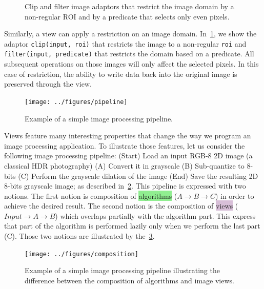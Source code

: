 \begin{figure}[htbp]
  \centering
  \hfil

  \caption{Clip and filter image adaptors that restrict the image domain by a non-regular ROI and by a predicate that
    selects only even pixels.}
  \label{fig:view.clip}
\end{figure}

Similarly, a view can apply a restriction on an image domain. In~\cref{fig:view.clip}, we show the adaptor
\texttt{clip(input, roi)} that restricts the image to a non-regular \texttt{roi} and \texttt{filter(input, predicate)}
that restricts the domain based on a predicate. All subsequent operations on those images will only affect the selected
pixels. In this case of restriction, the ability to write data back into the original image is preserved through the
view.

\begin{figure}[htbp]
  \centering
  \texttt{[image: ../figures/pipeline]}
  \caption{Example of a simple image processing pipeline.}
  \label{fig:view.pipeline}
\end{figure}

Views feature many interesting properties that change the way we program an image processing application. To illustrate
those features, let us consider the following image processing pipeline: (Start) Load an input RGB-8 2D image (a
classical HDR photography) (A) Convert it in grayscale (B) Sub-quantize to 8-bits (C) Perform the grayscale dilation of
the image (End) Save the resulting 2D 8-bits grayscale image; as described in~\cref{fig:view.pipeline}. This pipeline is
expressed with two notions. The first notion is composition of \colorbox{lightgreen}{algorithms} (\(A \rightarrow B
\rightarrow C\)) in order to achieve the desired result. The second notion is the composition of
\colorbox{thistle}{views} (\(Input \rightarrow A \rightarrow B\)) which overlaps partially with the algorithm part. This
express that part of the algorithm is performed lazily only when we perform the last part (C). Those two notions are
illustrated by the~\cref{fig:view.comp}.

\begin{figure}[htbp]
  \centering
  \texttt{[image: ../figures/composition]}
  \caption{Example of a simple image processing pipeline illustrating the difference between the composition of
    algorithms and image views.}
  \label{fig:view.comp}
\end{figure}

